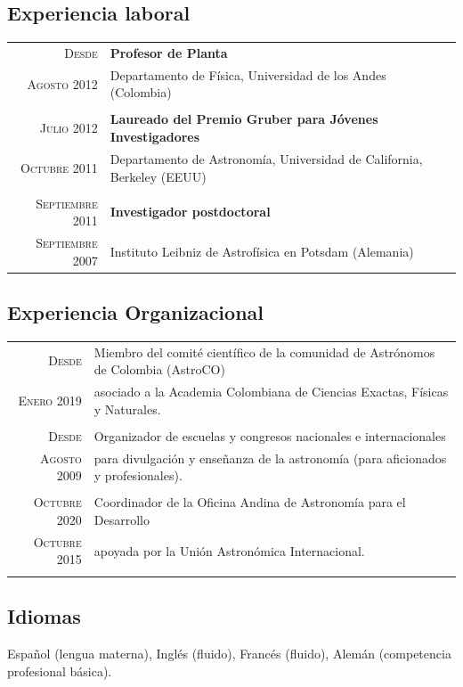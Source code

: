\documentclass[a4paper,10pt]{article} %
\begin{document}
\color{red}
\subsection{Experiencia laboral}
\color{black}

\begin{tabular}{rl}	
 \textsc{Desde} &  {\bf Profesor de Planta}\\
 \textsc{Agosto 2012} & Departamento de Física, Universidad de los Andes (Colombia) \\
&\\
 \textsc{Julio 2012} &  {\bf Laureado del Premio Gruber para Jóvenes Investigadores}\\
 \textsc{Octubre 2011} & Departamento de Astronomía, Universidad de California, Berkeley (EEUU) \\
&\\
 \textsc{Septiembre 2011} &  {\bf Investigador postdoctoral}\\
 \textsc{Septiembre 2007} & Instituto Leibniz de Astrofísica en Potsdam (Alemania) \\ 
\end{tabular}



\color{red}
\subsection{Experiencia Organizacional}
\color{black}


\begin{tabular}{rl}	
\textsc{Desde} & Miembro del comité científico de la comunidad de Astrónomos de Colombia (AstroCO)  \\
\textsc{Enero 2019} & asociado a la Academia Colombiana de Ciencias Exactas, Físicas y Naturales.\\
& \\ 
\textsc{Desde} & Organizador de escuelas y congresos nacionales e internacionales\\%
\textsc{Agosto 2009} & para divulgación y enseñanza de la astronomía (para aficionados y profesionales).\\
& \\ %
  \textsc{Octubre 2020} &  Coordinador de la Oficina Andina de Astronomía para el Desarrollo\\
 \textsc{Octubre 2015} & apoyada por la Unión Astronómica Internacional.\\
& \\
\end{tabular}


\color{red}
\subsection{Idiomas}
\color{black}


Español (lengua materna), Inglés (fluido), Francés (fluido), Alemán (competencia profesional básica).
 
\end{document}
